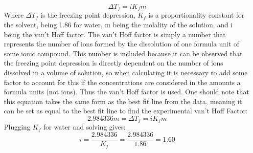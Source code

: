 \documentclass[12pt, letterpaper]{article}
\begin{document}
\begin{equation}
\Delta T_f = iK_f m
\end{equation}
Where $\Delta T_f$ is the freezing point depression, $K_f$ is a proportionality constant for the solvent, being 1.86 for water, m being the molality of the solution, and i being the van't Hoff factor. The van't Hoff factor is simply a number that represents the number of ions formed by the dissolution of one formula unit of some ionic compound. This number is included because it can be observed that the freezing point depression is directly dependent on the number of ions dissolved in a volume of solution, so when calculating it is necessary to add some factor to account for this if the concentrations are considered in the amounts a formula units (not ions). Thus the van't Hoff factor is used. One should note that this equation takes the same form as the best fit line from the data, meaning it can be set as equal to the best fit line to find the experimental van't Hoff Factor:
\begin{equation}
2.984336 m = \Delta T_f = i K_f m 
\end{equation}
Plugging $K_f$ for water and solving gives:
\begin{equation}
i = \frac{2.984336}{K_f}= \frac{2.984336}{1.86} = 1.60
\end{equation}
\end{document}
